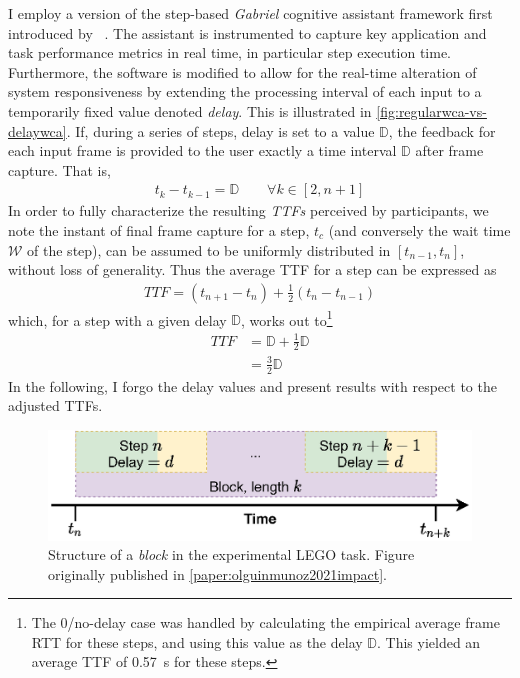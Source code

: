 I employ a version of the step-based \emph{Gabriel} cognitive assistant framework first introduced by \citeauthor{chen2018application}~\cite{chen2018application}.
The assistant is instrumented to capture key application and task performance metrics in real time, in particular step execution time.
Furthermore, the software is modified to allow for the real-time alteration of system responsiveness by extending the processing interval of each input to a temporarily fixed value denoted \emph{delay}.
This is illustrated in \cref{fig:regularwca-vs-delaywca}.
If, during a series of steps, delay is set to a value \ensuremath{\mathbb{D}}, the feedback for each input frame is provided to the user exactly a time interval \ensuremath{\mathbb{D}} after frame capture.
That is,
\begin{align}
    t_k - t_{k - 1} = \mathbb{D} \qquad \forall k \in [2, n + 1]
\end{align}
In order to fully characterize the resulting \emph{\glspl{TTF}} perceived by participants, we note the instant of final frame capture for a step, \ensuremath{t_c} (and conversely the wait time \( \mathcal{W} \) of the step), can be assumed to be uniformly distributed in \( [t_{n - 1}, t_n] \), without loss of generality.
Thus the average \gls{TTF} for a step can be expressed as
\begin{align*}
    TTF = (t_{n + 1} - t_{n}) + \frac{1}{2}(t_n - t_{n - 1})
\end{align*}
which, for a step with a given delay \ensuremath{\mathbb{D}}, works out to\footnote{%
    The \num{0}/no-delay case was handled by calculating the empirical average frame \gls{RTT} for these steps, and using this value as the delay \ensuremath{\mathbb{D}}.
    This yielded an average \gls{TTF} of \SI{0.57}{\second} for these steps.
}
\begin{align}
    TTF &= \mathbb{D} + \frac{1}{2}\mathbb{D}\nonumber\\
    &= \frac{3}{2}\mathbb{D}
\end{align}
In the following, I forgo the delay values and present results with respect to the adjusted \glspl{TTF}.

\begin{figure}[tb]
    \centering
    \includegraphics[width=.6\textwidth]{publications/2021ImpactDelayedResponse/Fig4c}
    \caption{%
        Structure of a \emph{block} in the experimental LEGO task.
        Figure originally published in \cref{paper:olguinmunoz2021impact}.
    }\label{fig:stepblock}
\end{figure}


